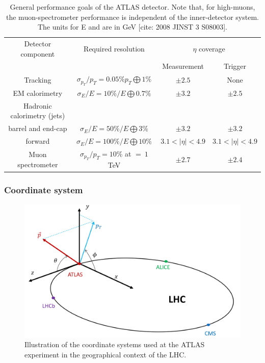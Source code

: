 \documentclass[letterpaper,12pt]{article}
\begin{document}
\begin{table}[]
	\centering
	\small
	\setlength\tabcolsep{5pt} 
	\begin{tabular}{|c|c|c|c| }
	\hline
	 Detector component & Required resolution& \multicolumn{2}{c|}{$\eta$ coverage} \\
	& & Measurement &  Trigger\\ 
	 \hline
	Tracking         &    $\sigma_{p_T}/p_T = 0.05\%p_T\bigoplus 1\% $        &  $\pm 2.5$  & None \\  
	\hline
	EM calorimetry      &  $\sigma_E/E = 10\%/E\bigoplus 0.7\% $       & $\pm 3.2$ &  $\pm 2.5$\\
	\hline
	Hadronic calorimetry (jets)   &        & &      \\
	barrel and end-cap &  $\sigma_E/E = 50\%/E\bigoplus 3\% $       & $\pm 3.2$ &  $\pm 3.2$\\
	forward   &  $\sigma_E/E = 100\%/E\bigoplus 10\% $       & $ 3.1 < |\eta | < 4.9 $ &  $3.1 < |\eta | < 4.9 $\\
	\hline
	Muon spectrometer  &    $\sigma_{p_T}/p_T = 10\%$ at \pt $=\ 1$ TeV        &  $\pm 2.7$  & $\pm 2.4$ \\  
	\hline
	\end{tabular}
	\vspace{0.2cm}
	\caption{General performance goals of the ATLAS detector. Note that, for high-\pt muons,
	the muon-spectrometer performance is independent of the inner-detector system. The units for E
	and \pt are in GeV [cite: 2008 JINST 3 S08003].}
	\label{tab:ATLAS_performance}
\end{table}

	\subsubsection{Coordinate system}
	\label{sec:detector coordinate}

	\begin{figure}[]
		\begin{centering}	
		\includegraphics[width=.4\textwidth]{Detector_plots/ATLAS coordinate system.png}
		\caption{Illustration of the coordinate systems 
		used at the ATLAS experiment in the geographical context of the LHC.
			}
		\label{fig:ATLAS_coordinate_system}
		\end{centering}
	\end{figure}
\end{document}
